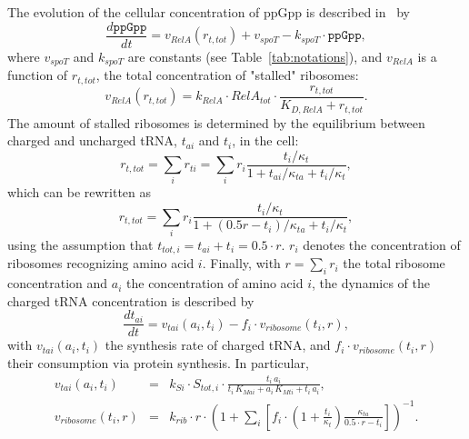 The evolution of the cellular concentration of ppGpp is described in~\cite{bosdriesz_how_2015} by
\begin{equation}
\label{eq:ppGpp}
\frac{d\texttt{ppGpp}}{dt} = v_{RelA}(r_{t,tot}) + v_{spoT} - k_{spoT} \cdot \texttt{ppGpp},
\end{equation}
where $v_{spoT}$ and $k_{spoT}$ are constants (see Table~\ref{tab:notations}), and $v_{RelA}$ is a function of $r_{t,tot}$, the total concentration of "stalled" ribosomes:
\begin{equation}
\label{eq:vrelA}
v_{RelA}(r_{t,tot}) = k_{RelA} \cdot RelA_{tot} \cdot \frac{r_{t,tot}}{K_{D,RelA} + r_{t,tot}}.
\end{equation}
The amount of stalled ribosomes is determined by the equilibrium between charged and uncharged tRNA, $t_{ai}$ and $t_{i}$, in the cell:
\begin{equation}
\label{eq:rttot}
r_{t,tot} = \sum_i r_{ti} = \sum_i r_i \frac{t_i/\kappa_{t}}{1+t_{ai}/\kappa_{ta}+t_i/\kappa_{t}},
\end{equation}
which can be rewritten as
\begin{equation}
\label{eq:rttot-f}
r_{t,tot} = \sum_i r_i \frac{t_i/\kappa_{t}}{1+(0.5 r-t_i)/\kappa_{ta}+t_i/\kappa_{t}},
\end{equation}
using the assumption that $t_{tot,i}  = t_{ai} + t_i = 0.5 \cdot r$.
$r_i$ denotes the concentration of ribosomes recognizing amino acid  $i$.
Finally, with $r = \sum_i r_i$ the total ribosome concentration and $a_i$ the concentration of amino acid $i$, the dynamics of the charged tRNA concentration is described by
\begin{equation}
\label{eq:ti_dynamic}
\frac{dt_{ai}}{dt} = v_{tai}(a_i, t_{i}) - f_i \cdot v_{ribosome}(t_i,r),
\end{equation}
with $v_{tai}(a_i, t_{i})$ the synthesis rate of charged tRNA, and $f_i \cdot v_{ribosome}(t_i,r)$ their consumption via protein synthesis.
In particular,
\begin{eqnarray}
v_{tai}(a_i, t_{i}) &=& k_{Si} \cdot S_{tot,i} \cdot \frac{t_i\, a_i}{t_i\,  K_{Mai} + a_i\,  K_{Mti} + t_i\,  a_i}, \label{eq:vtai}\\
v_{ribosome}(t_i, r) &=& k_{rib} \cdot r \cdot \left(1+ \sum_i \left[ f_i \cdot \left( 1 + \frac{t_i}{\kappa_t} \right) \frac{\kappa_{ta}}{0.5\cdot r - t_i} \right]\right)^{-1}. \label{eq:vrib}
\end{eqnarray}

